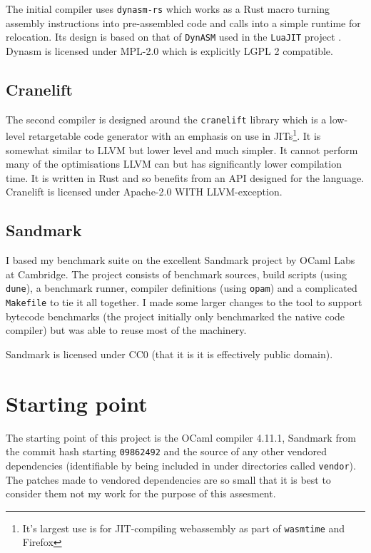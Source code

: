The initial compiler uses \texttt{dynasm-rs} \cite{dynasmrs} which works as a Rust macro turning
assembly instructions into pre-assembled code and calls into a simple runtime for relocation. Its
design is based on that of \texttt{DynASM} used in the \texttt{LuaJIT} project \cite{dynasm}.
Dynasm is licensed under MPL-2.0 which is explicitly LGPL 2 compatible.

\subsection{Cranelift}

The second compiler is designed around the \texttt{cranelift} \cite{cranelift} library which is a
low-level retargetable code generator with an emphasis on use in JITs\footnote{It's largest use is
    for JIT-compiling webassembly as part of \texttt{wasmtime} and Firefox}. It is somewhat similar
to
LLVM but lower level and much simpler. It cannot perform many of the optimisations LLVM can but has
significantly lower compilation time. It is written in Rust and so benefits from an API designed
for the language. Cranelift is licensed under Apache-2.0 WITH LLVM-exception.

\subsection{Sandmark}

I based my benchmark suite on the excellent Sandmark project by OCaml Labs at Cambridge. The
project consists of benchmark sources, build scripts (using \texttt{dune}), a benchmark runner,
compiler definitions (using \texttt{opam}) and a complicated \texttt{Makefile} to tie it all
together.  I made some larger changes to the tool to support bytecode benchmarks (the project
initially only benchmarked the native code compiler) but was able to reuse most of the machinery.

Sandmark is licensed under CC0 (that it is it is effectively public domain).

\section{Starting point}

The starting point of this project is the OCaml compiler 4.11.1, Sandmark from the commit hash
starting \texttt{09862492} and the source of any other vendored dependencies (identifiable by being
included in under directories called \texttt{vendor}). The patches made to vendored dependencies
are
so small that it is best to consider them not my work for the purpose of this assesment.

